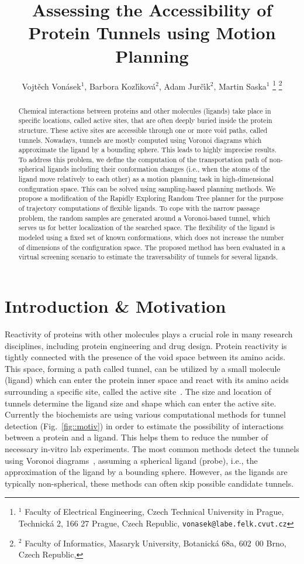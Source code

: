 \documentclass[usletter, 10pt, conference]{ieeeconf} %
\title{Assessing the Accessibility of Protein Tunnels using Motion Planning}
\author{Vojt\v ech Von\' asek$^{1}$,
    Barbora Kozl\'\i kov\'a$^{2}$,
    Adam Jur\v{c}\'\i k$^{2}$,
    Martin Saska$^{1}$
\thanks{$^{1}$ Faculty of Electrical Engineering,  Czech Technical University in Prague, 
Technick\'a 2, 166 27 Prague, Czech Republic,
{\tt vonasek@labe.felk.cvut.cz}}
\thanks{$^{2}$        
Faculty of Informatics, Masaryk University, Botanick\'a 68a, 602~00 Brno, Czech Republic,
}
}
\begin{document}
\maketitle
\thispagestyle{empty}
\pagestyle{empty}

\begin{abstract}
Chemical interactions between proteins and other molecules (ligands) take place in specific locations, called active sites, that are often deeply buried inside the protein structure.
These active sites are accessible through one or more void paths, called tunnels.
Nowadays, tunnels are mostly computed using Voronoi diagrams which approximate the ligand by a bounding sphere.
This leads to highly imprecise results.
To address this problem, we define the computation of the transportation path of non-spherical ligands including their conformation changes (i.e., when the atoms of the ligand move relatively to each other) as a motion planning task in high-dimensional configuration space.
This can be solved using sampling-based planning methods.
We propose a modification of the Rapidly Exploring Random Tree planner for the purpose of trajectory computations of flexible ligands.
To cope with the narrow passage problem, the random samples are generated around a Voronoi-based tunnel, which serves us for better localization of the searched space.
The flexibility of the ligand is modeled using a fixed set of known conformations, which does not increase the number of dimensions of the configuration space.
The proposed method has been evaluated in a virtual screening scenario to estimate the traversability of tunnels for several ligands.
\end{abstract}


\section{Introduction \& Motivation}


Reactivity of proteins with other molecules plays a crucial role in many research disciplines, including protein engineering and drug design.
Protein reactivity is tightly connected with the presence of the void space between its amino acids. 
This space, forming a path called tunnel, can be utilized by a small molecule (ligand) which can enter the protein inner space and react with its amino acids surrounding a specific site, called the active site~\cite{gora2013gates}.
The size and location of tunnels determine the ligand size and shape which can enter the active site.
Currently the biochemists are using various computational methods for tunnel detection (Fig.~\ref{fig::motiv}) in order to estimate the possibility of interactions between a protein and a ligand.
This helps them to reduce the number of necessary in-vitro lab experiments.
The most common methods detect the tunnels using Voronoi diagrams~\cite{yaffe2008,caver3}, assuming a spherical ligand (probe), i.e., the approximation of the ligand by a bounding sphere.
However, as the ligands are typically non-spherical, these methods can often skip possible candidate tunnels.
\end{document}
